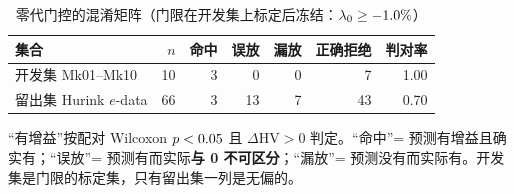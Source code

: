 \begin{table}[htbp]
  \centering
  \caption{零代门控的混淆矩阵（门限在开发集上标定后冻结：$\lambda_0\ge-1.0\%$）}
  \label{tab:gate}
  \small
  \begin{tabular}{lrrrrrr}
    \toprule
    集合 & $n$ & 命中 & 误放 & 漏放 & 正确拒绝 & 判对率 \\
    \midrule
    开发集 Mk01--Mk10 & 10 & 3 & 0 & 0 & 7 & 1.00 \\
    留出集 Hurink $e$-data & 66 & 3 & 13 & 7 & 43 & 0.70 \\
    \bottomrule
  \end{tabular}
  \par\vspace{3pt}\footnotesize\begin{minipage}{\linewidth}“有增益”按配对 Wilcoxon $p<0.05$ 且 $\Delta$HV$>0$ 判定。“命中”= 预测有增益且确实有；“误放”= 预测有而实际\textbf{与 0 不可区分}；“漏放”= 预测没有而实际有。开发集是门限的标定集，只有留出集一列是无偏的。\end{minipage}
\end{table}

